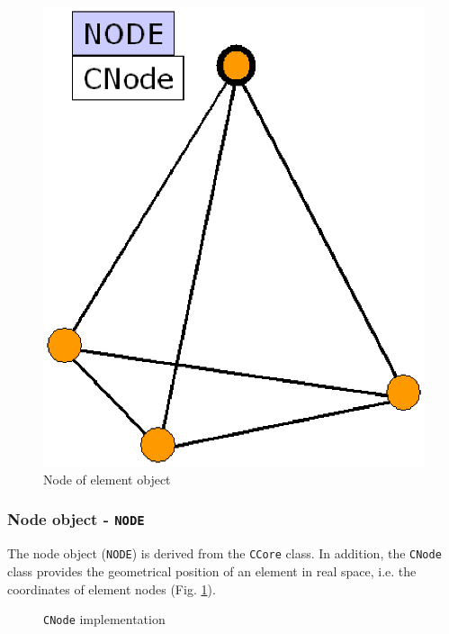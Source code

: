 \begin{figure}[H]
\centering
\includegraphics[scale=0.4]{figures/node.eps}
\caption{Node of element object} \label{fig:node1}
\end{figure}

\subsubsection{Node object - \texttt{NODE}}
\label{sec:node}

The node object (\texttt{NODE}) is derived from the \texttt{CCore}
class. In addition, the \texttt{CNode} class provides the
geometrical position of an element in real space, i.e. the coordinates
of element nodes (Fig. \ref{fig:node1}).

\begin{figure}[H]
\centering
{}
\caption{\texttt{CNode} implementation}
\label{fig:node}
\end{figure}

